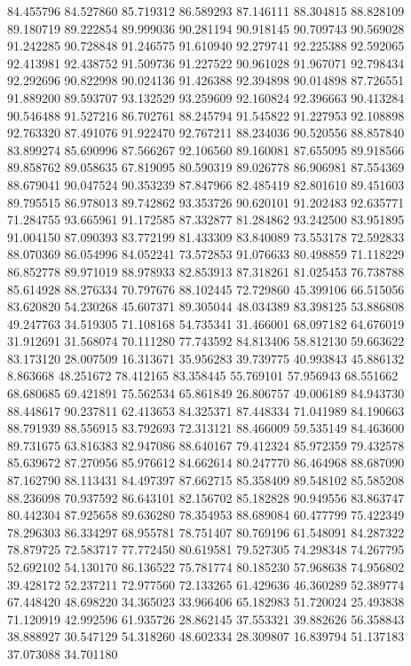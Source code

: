 84.455796
84.527860
85.719312
86.589293
87.146111
88.304815
88.828109
89.180719
89.222854
89.999036
90.281194
90.918145
90.709743
90.569028
91.242285
90.728848
91.246575
91.610940
92.279741
92.225388
92.592065
92.413981
92.438752
91.509736
91.227522
90.961028
91.967071
92.798434
92.292696
90.822998
90.024136
91.426388
92.394898
90.014898
87.726551
91.889200
89.593707
93.132529
93.259609
92.160824
92.396663
90.413284
90.546488
91.527216
86.702761
88.245794
91.545822
91.227953
92.108898
92.763320
87.491076
91.922470
92.767211
88.234036
90.520556
88.857840
83.899274
85.690996
87.566267
92.106560
89.160081
87.655095
89.918566
89.858762
89.058635
67.819095
80.590319
89.026778
86.906981
87.554369
88.679041
90.047524
90.353239
87.847966
82.485419
82.801610
89.451603
89.795515
86.978013
89.742862
93.353726
90.620101
91.202483
92.635771
71.284755
93.665961
91.172585
87.332877
81.284862
93.242500
83.951895
91.004150
87.090393
83.772199
81.433309
83.840089
73.553178
72.592833
88.070369
86.054996
84.052241
73.572853
91.076633
80.498859
71.118229
86.852778
89.971019
88.978933
82.853913
87.318261
81.025453
76.738788
85.614928
88.276334
70.797676
88.102445
72.729860
45.399106
66.515056
83.620820
54.230268
45.607371
89.305044
48.034389
83.398125
53.886808
49.247763
34.519305
71.108168
54.735341
31.466001
68.097182
64.676019
31.912691
31.568074
70.111280
77.743592
84.813406
58.812130
59.663622
83.173120
28.007509
16.313671
35.956283
39.739775
40.993843
45.886132
8.863668
48.251672
78.412165
83.358445
55.769101
57.956943
68.551662
68.680685
69.421891
75.562534
65.861849
26.806757
49.006189
84.943730
88.448617
90.237811
62.413653
84.325371
87.448334
71.041989
84.190663
88.791939
88.556915
83.792693
72.313121
88.466009
59.535149
84.463600
89.731675
63.816383
82.947086
88.640167
79.412324
85.972359
79.432578
85.639672
87.270956
85.976612
84.662614
80.247770
86.464968
88.687090
87.162790
88.113431
84.497397
87.662715
85.358409
89.548102
85.585208
88.236098
70.937592
86.643101
82.156702
85.182828
90.949556
83.863747
80.442304
87.925658
89.636280
78.354953
88.689084
60.477799
75.422349
78.296303
86.334297
68.955781
78.751407
80.769196
61.548091
84.287322
78.879725
72.583717
77.772450
80.619581
79.527305
74.298348
74.267795
52.692102
54.130170
86.136522
75.781774
80.185230
57.968638
74.956802
39.428172
52.237211
72.977560
72.133265
61.429636
46.360289
52.389774
67.448420
48.698220
34.365023
33.966406
65.182983
51.720024
25.493838
71.120919
42.992596
61.935726
28.862145
37.553321
39.882626
56.358843
38.888927
30.547129
54.318260
48.602334
28.309807
16.839794
51.137183
37.073088
34.701180
